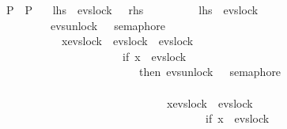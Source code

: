 \begin{isabellebody}
\ \ \ \ \ \ \ \ \ \ \ {\isacharbar}{\kern0pt}{\isacharbar}{\kern0pt}\ {\isacharparenleft}{\kern0pt}P{}\ {\isacharbar}{\kern0pt}{\isacharbar}{\kern0pt}{\isacharbar}{\kern0pt}\ P{}{\isacharparenright}{\kern0pt}{\isacharparenright}{\kern0pt}{\isacartoucheclose}\isanewline
\ \ {\isacharparenleft}{\kern0pt}\ {\isachardoublequoteopen}{\isacharquery}{\kern0pt}lhs\ {\isacharequal}{\kern0pt}\ evs{\isachardot}{\kern0pt}lock\ {}\ {\isasymrightarrow}\ {\isacharquery}{\kern0pt}rhs{\isachardoublequoteclose}{\isacharparenright}{\kern0pt}\isanewline
%
\isadelimproof
%
\endisadelimproof
%
\isatagproof
{}\isamarkupfalse%
\ {\isacharminus}{\kern0pt}\ \isanewline
\ \ \ \isamarkupfalse%
\ {\isacharasterisk}{\kern0pt}\ {\isacharcolon}{\kern0pt}\ {\isachardoublequoteopen}{\isacharquery}{\kern0pt}lhs\ {\isacharequal}{\kern0pt}\ evs{\isachardot}{\kern0pt}lock\ {}\ {\isasymrightarrow}\isanewline
\ \ \ \ \ \ \ \ \ \ \ \ \ \ \ \ \ \ \ \ {\isacharparenleft}{\kern0pt}{\isacharparenleft}{\kern0pt}evs{\isachardot}{\kern0pt}unlock\ {}\ {\isasymrightarrow}\ semaphore\ {}\ \isanewline
\ \ \ \ \ \ \ \ \ \ \ \ \ \ \ \ \ \ \ \ \ {\isacharbar}{\kern0pt}{\isacharbar}{\kern0pt}{\isacharbar}{\kern0pt}\ {\isasymbox}x{\isasymin}{\isacharbraceleft}{\kern0pt}evs{\isachardot}{\kern0pt}lock\ {}{\isacharcomma}{\kern0pt}\ evs{\isachardot}{\kern0pt}lock\ {}{\isacharcomma}{\kern0pt}\ evs{\isachardot}{\kern0pt}lock\ {}{\isacharbraceright}{\kern0pt}\isanewline
\ \ \ \ \ \ \ \ \ \ \ \ \ \ \ \ \ \ \ \ \ \ \ \ \ \ \ \ \ \ \ \ {\isasymrightarrow}\ {\isacharparenleft}{\kern0pt}if\ x\ {\isacharequal}{\kern0pt}\ evs{\isachardot}{\kern0pt}lock\ {}\isanewline
\ \ \ \ \ \ \ \ \ \ \ \ \ \ \ \ \ \ \ \ \ \ \ \ \ \ \ \ \ \ \ \ \ \ \ \ then\ evs{\isachardot}{\kern0pt}unlock\ {}\ {\isasymrightarrow}\ semaphore\ {}\ \isanewline
\ \ \ \ \ \ \ \ \ \ \ \ \ \ \ \ \ \ \ \ \ \ \ \ \ \ \ \ \ \ \ \ \ \ \ \ \ \ \ \ \ {\isacharbar}{\kern0pt}{\isacharbar}{\kern0pt}{\isacharbar}{\kern0pt}\ \isanewline
\ \ \ \ \ \ \ \ \ \ \ \ \ \ \ \ \ \ \ \ \ \ \ \ \ \ \ \ \ \ \ \ \ \ \ \ \ \ \ \ \ {\isasymbox}x{\isasymin}{\isacharbraceleft}{\kern0pt}evs{\isachardot}{\kern0pt}lock\ {}{\isacharcomma}{\kern0pt}\ evs{\isachardot}{\kern0pt}lock\ {}{\isacharbraceright}{\kern0pt}\isanewline
\ \ \ \ \ \ \ \ \ \ \ \ \ \ \ \ \ \ \ \ \ \ \ \ \ \ \ \ \ \ \ \ \ \ \ \ \ \ \ \ \ \ \ \ \ \ \ {\isasymrightarrow}\ {\isacharparenleft}{\kern0pt}if\ x\ {\isacharequal}{\kern0pt}\ evs{\isachardot}{\kern0pt}lock\ {}\ \isanewline

\end{isabellebody}
